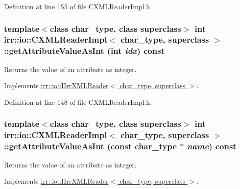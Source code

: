 Definition at line 155 of file CXMLReaderImpl.h.\hypertarget{classirr_1_1io_1_1_c_x_m_l_reader_impl_8c8cf8e6560299e3315cd1a75477bd53}{
\subsubsection[{getAttributeValueAsInt}]{\setlength{\rightskip}{0pt plus 5cm}template$<$class char\_\-type, class superclass$>$ int {\bf irr::io::CXMLReaderImpl}$<$ char\_\-type, {\bf superclass} $>$::getAttributeValueAsInt (int {\em idx}) const}}
\label{classirr_1_1io_1_1_c_x_m_l_reader_impl_8c8cf8e6560299e3315cd1a75477bd53}


Returns the value of an attribute as integer. 



Implements \hyperlink{classirr_1_1io_1_1_i_irr_x_m_l_reader_8f2d57c9f358b9683fb177f440661426}{irr::io::IIrrXMLReader$<$ char\_\-type, superclass $>$}.

Definition at line 148 of file CXMLReaderImpl.h.\hypertarget{classirr_1_1io_1_1_c_x_m_l_reader_impl_5d532267e6e4ac8fcb402671842c32c9}{
\subsubsection[{getAttributeValueAsInt}]{\setlength{\rightskip}{0pt plus 5cm}template$<$class char\_\-type, class superclass$>$ int {\bf irr::io::CXMLReaderImpl}$<$ char\_\-type, {\bf superclass} $>$::getAttributeValueAsInt (const char\_\-type $\ast$ {\em name}) const}}
\label{classirr_1_1io_1_1_c_x_m_l_reader_impl_5d532267e6e4ac8fcb402671842c32c9}


Returns the value of an attribute as integer. 



Implements \hyperlink{classirr_1_1io_1_1_i_irr_x_m_l_reader_b37bef58865355a7dba0011a38e6c8e7}{irr::io::IIrrXMLReader$<$ char\_\-type, superclass $>$}.

